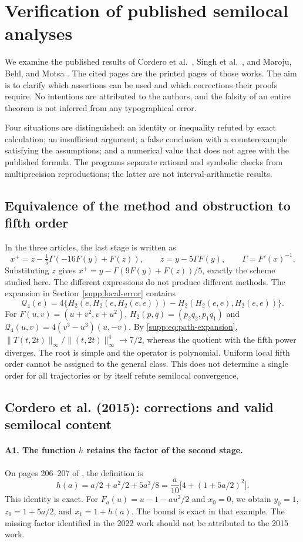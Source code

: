\documentclass[11pt,a4paper]{article}
\numberwithin{equation}{section}
\numberwithin{table}{section}
\theoremstyle{plain}
\theoremstyle{definition}\newtheorem{definition}[theorem]{Definition}
\theoremstyle{remark}\newtheorem{remark}[theorem]{Remark}
\begin{document}
\section{Verification of published semilocal analyses}\label{supp:published-analyses}
We examine the published results of Cordero et
al.~\cite{CorderoSemilocal2015}, Singh et al.\ \cite{SinghEtAl2016},
and Maroju, Behl, and Motsa \cite{MarojuBehlMotsa2022}.
The cited pages are the printed pages of those works. The aim is to
clarify which assertions can be used and which corrections their
proofs require. No intentions are attributed to the authors, and the
falsity of an entire theorem is not inferred from any typographical error.

Four situations are distinguished: an identity or inequality refuted
by exact calculation; an insufficient argument; a false conclusion
with a counterexample satisfying the assumptions; and a numerical
value that does not agree with the published formula. The programs
separate rational and symbolic checks from multiprecision reproductions;
the latter are not interval-arithmetic results.

\subsection{Equivalence of the method and obstruction to fifth order}
In the three articles, the last stage is written as
\[
 x^+=z-\tfrac15\Gamma(-16F(y)+F(z)),\qquad
 z=y-5\Gamma F(y),\qquad \Gamma=F'(x)^{-1}.
\]
Substituting $z$ gives $x^+=y-\Gamma(9F(y)+F(z))/5$, exactly the scheme
studied here. The different expressions do not produce different
methods. The expansion in Section~\ref{supp:local-error} contains
\[
 \mathcal Q_4(e)=4\{H_2(e,H_2(e,H_2(e,e)))-H_2(H_2(e,e),H_2(e,e))\}.
\]
For $F(u,v)=(u+v^2,v+u^2)$, $H_2(p,q)=(p_2q_2,p_1q_1)$ and
$\mathcal Q_4(u,v)=4(v^3-u^3)(u,-v)$.
By \eqref{supp:eq:path-expansion},
$\|T(t,2t)\|_\infty/\|(t,2t)\|_\infty^4\to7/2$, whereas the
quotient with the fifth power diverges. The root is simple and the
operator is polynomial. Uniform local fifth order cannot be assigned
to the general class. This does not determine a single order for all
trajectories or by itself refute semilocal convergence.

\subsection{Cordero et al. (2015): corrections and valid semilocal content}
\paragraph{A1. The function $h$ retains the factor of the second stage.}
On pages 206--207 of \cite{CorderoSemilocal2015}, the definition is
\[
 h(a)=a/2+a^2/2+5a^3/8=\frac a{10}\bigl[4+(1+5a/2)^2\bigr].
\]
This identity is exact. For $F_a(u)=u-1-au^2/2$ and $x_0=0$, we
obtain $y_0=1$, $z_0=1+5a/2$, and $x_1=1+h(a)$. The bound is exact
in that example. The missing factor identified in the 2022 work
should not be attributed to the 2015 work.
\end{document}

